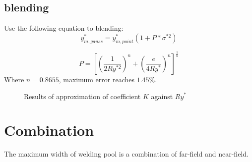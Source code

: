 \documentclass[review, 1p, number, sort&compress,table]{elsarticle}
\begin{document}
	\subsection{blending}
	Use the following equation to blending:
	\begin{equation} \label{eq:blending s/s}
		y^{*}_{m,gauss}=y^{*}_{m,point}\left(1+P*\sigma^{*2}\right)
	\end{equation}
	
	\begin{equation}
		P=\left[\left( \frac{1}{2Ry^{*2}}\right)^n+  \left( \frac{e}{4Ry^{*}}\right)^n  \right]^{\frac{1}{n}}
	\end{equation}
	Where $n=0.8655$, maximum error reaches $1.45\%$.
		\begin{figure*}[ht!]
			\begin{center}
			\end{center}
			\caption{Results of approximation of coefficient $K$ against $Ry^{*}$  }
			\label{fig:A.PvR}
			
		\end{figure*}
	\section{Combination}
	The maximum width of welding pool is a combination of far-field and near-field.
\end{document}
